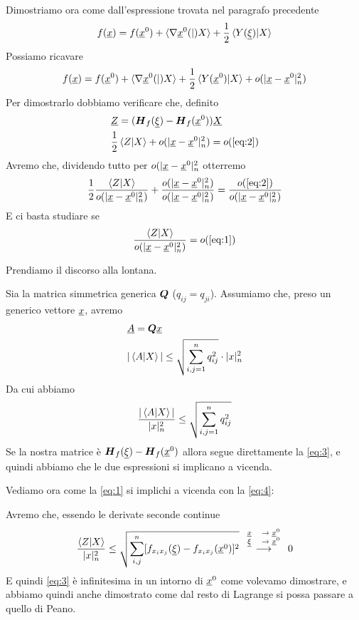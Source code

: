 \bigskip

Dimostriamo ora come dall'espressione trovata nel paragrafo precedente
\begin{align}
	f(\underline{x})=f(\underline{x}^0) + \braket{\nabla \underline{x}^0(|)X} + \frac{1}{2} \braket{Y(\underline{\xi})|X}
	\label{eq:1}
\end{align}
Possiamo ricavare
\begin{align}
	f(\underline{x})=f(\underline{x}^0) + \braket{\nabla \underline{x}^0(|)X} + \frac{1}{2} \braket{Y(\underline{x}^0)|X} + o(|\underline{x} - \underline{x}^0|^2_n)
	\label{eq:2}
\end{align}
Per dimostrarlo dobbiamo verificare che, definito
\begin{align}
	&\underline{Z} = ( \boldsymbol{H}_{f} (\underline{\xi}) - \boldsymbol{H}_{f} (\underline{x}^0) )  \underline{X}\\
	& \frac{1}{2} \braket{Z|X} + o(|\underline{x} - \underline{x}^0|^2_n)=o(\ref{eq:2})
\end{align}
Avremo che, dividendo tutto per $o(|\underline{x} - \underline{x}^0|^2_n$ otterremo
\begin{align}
	\frac{1}{2} \frac{\braket{Z|X}}{o(|\underline{x} - \underline{x}^0|^2_n)} + \frac{o(|\underline{x} - \underline{x}^0|^2_n)}{o(|\underline{x} - \underline{x}^0|^2_n)}=\frac{o(\ref{eq:2})}{o(|\underline{x} - \underline{x}^0|^2_n)}
\end{align}
E ci basta studiare se
\begin{align}
	\frac{\braket{Z|X}}{o(|\underline{x} - \underline{x}^0|^2_n)} = o(\ref{eq:1})
	\label{eq:3}
\end{align}

Prendiamo il discorso alla lontana.

Sia la matrica simmetrica generica $\boldsymbol{Q}$ ($q_{ij}=q_{ji}$). Assumiamo che, preso un generico vettore $\underline{x}$, avremo
\begin{align}
	&\underline{A}= \boldsymbol{Q}  \underline{x}\\
	&|\braket{A|X}|\leq \sqrt{\sum_{i,j=1}^{n} q_{ij}^2} \cdot |x|_n^2
\end{align}
Da cui abbiamo
\begin{align}
	\frac{|\braket{A|X}|}{|x|_n^2} \leq \sqrt{\sum_{i,j=1}^{n} q_{ij}^2}
	\label{eq:4}
\end{align}
Se la nostra matrice è $\boldsymbol{H}_{f} (\underline{\xi}) - \boldsymbol{H}_{f} (\underline{x}^0)$ allora segue direttamente la \ref{eq:3}, e quindi abbiamo che le due espressioni si implicano a vicenda.

\bigskip


Vediamo ora come la \ref{eq:1}  si implichi a vicenda con la \ref{eq:4}:

Avremo che, essendo le derivate seconde continue
\begin{align}
	\frac{\braket{Z|X}}{|x|_n^2} \leq \sqrt{\sum_{i,j}^{n} [f_{x_i x_j}(\underline{\xi}) - f_{x_i x_j}(\underline{x}^0)]^2} \overset{\scriptsize{\begin{array}{cc} \underline{x}{}&\rightarrow \underline{x}^0\\ \underline{\xi}&\rightarrow \underline{x}^0 \end{array}} }{\longrightarrow}0
\end{align}
E quindi \ref{eq:3} è infinitesima in un intorno di $\underline{x}^0$ come volevamo dimostrare, e abbiamo quindi anche dimostrato come dal resto di Lagrange si possa passare a quello di Peano.

